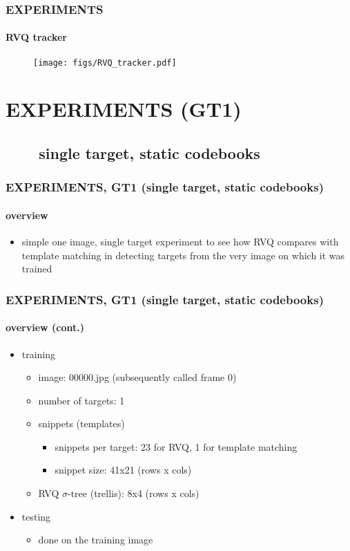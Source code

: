 \begin{frame}[plain]
\frametitle{EXPERIMENTS}
\framesubtitle{RVQ tracker}
\mypagenum
	\begin{changemargin}{-1.35in}{0in}
		\begin{figure}
			\texttt{[image: figs/RVQ\_tracker.pdf]}
		\end{figure}
	\end{changemargin}
\end{frame}

\section{EXPERIMENTS (GT1)}


\subsection{\ \ \ \ single target, static codebooks}


\begin{frame}
\frametitle{\small EXPERIMENTS, GT1 (single target, static codebooks)}
\framesubtitle{overview}
\mypagenum
	\begin{itemize}
		\item simple one image, single target experiment to see how RVQ compares with template matching in detecting targets from the very image on which it was trained
	\end{itemize}
\end{frame}



\begin{frame}
\frametitle{\small EXPERIMENTS, GT1 (single target, static codebooks)}
\framesubtitle{overview (cont.)}
\mypagenum
	\begin{itemize}
		\item {\color{red} training}
			\begin{itemize}
				\item image: 00000.jpg (subsequently called frame 0)
				\item number of targets: 1
				\item snippets (templates)
					\begin{itemize}
						\item snippets per target: 23 for RVQ, 1 for template matching
						\item snippet size: 41x21 (rows x cols)
					\end{itemize}
				\item RVQ $\sigma$-tree (trellis): 8x4 (rows x cols)
			\end{itemize}
		\item {\color{red} testing}
			\begin{itemize}
				\item done on the training image
			\end{itemize}
	\end{itemize}
\end{frame}

